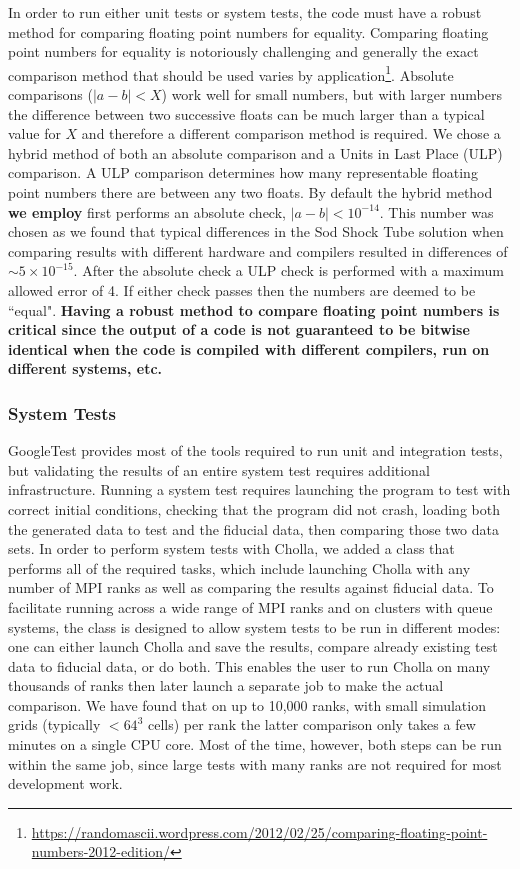 \documentclass[modern, linenumbers]{aastex631}
\begin{document}
In order to run either unit tests or system tests, the code must have a robust method for comparing floating point numbers for equality. Comparing floating point numbers for equality is notoriously challenging and generally the exact comparison method that should be used varies by application\textbf{\citep{goldberg_1991,muller_2018}}\footnote{\url{https://randomascii.wordpress.com/2012/02/25/comparing-floating-point-numbers-2012-edition/}}. Absolute comparisons ($|a-b| < X$) work well for small numbers, but with larger numbers the difference between two successive floats can be much larger than a typical value for $X$ and therefore a different comparison method is required. We chose a hybrid method of both an absolute comparison and a Units in Last Place (ULP) comparison. A ULP comparison determines how many representable floating point numbers there are between any two floats. By default the hybrid method \textbf{we employ} first performs an absolute check, $|a-b| < 10^{-14}$. This number was chosen as we found that typical differences in the Sod Shock Tube solution when comparing results with different hardware and compilers resulted in differences of $\sim5\times10^{-15}$. After the absolute check a ULP check is performed with a maximum allowed error of 4. If either check passes then the numbers are deemed to be ``equal". \textbf{Having a robust method to compare floating point numbers is critical since the output of a code is not guaranteed to be bitwise identical when the code is compiled with different compilers, run on different systems, etc.}

\subsubsection{System Tests}

GoogleTest provides most of the tools required to run unit and integration tests, but validating the results of an entire system test requires additional infrastructure. Running a system test requires launching the program to test with correct initial conditions, checking that the program did not crash, loading both the generated data to test and the fiducial data, then comparing those two data sets. In order to perform system tests with Cholla, we added a class that performs all of the required tasks, which include launching Cholla with any number of MPI ranks as well as comparing the results against fiducial data. To facilitate running across a wide range of MPI ranks and on clusters with queue systems, the class is designed to allow system tests to be run in different modes: one can either launch Cholla and save the results, compare already existing test data to fiducial data, or do both. This enables the user to run Cholla on many thousands of ranks then later launch a separate job to make the actual comparison. We have found that on up to 10,000 ranks, with small simulation grids (typically $<64^3$ cells) per rank the latter comparison only takes a few minutes on a single CPU core. Most of the time, however, both steps can be run within the same job, since large tests with many ranks are not required for most development work.
\end{document}
